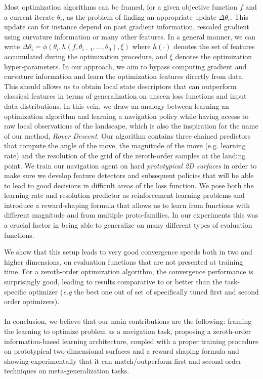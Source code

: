 	{
		Most optimization algorithms can be framed, for a given objective function $f$ and a current iterate $\theta_i$, as the problem of finding an appropriate update $\Delta \theta_i$. This update can for instance depend on past gradient information, rescaled gradient using curvature information or many other features. In a general manner, we can write $\Delta \theta_i = \phi( \theta_i, h(f,\theta_{i-1},\hdots,\theta_0),\xi)$ where $h(\cdot)$ denotes the set of features accumulated during the optimization procedure, and $\xi$ denotes the optimization hyper-parameters. 
		In our approach, we aim to bypass computing gradient and curvature information and learn the optimization features directly from data. This should allows us to obtain local state descriptors that can outperform classical features in terms of generalization on unseen loss functions and input data distributions. In this vein, we draw an analogy between learning an optimization algorithm and learning a navigation policy while having access to raw local observations of the landscape, which is also the inspiration for the name of our method, \emph{Rover Descent}. 
	Our algorithm contains three chained predictors that compute the angle of the move, the magnitude of the move (e.g. learning rate) and the resolution of the grid of the zeroth-order samples at the landing point. We train our navigation agent on hard \emph{prototypical 2D surfaces} in order to make sure we develop feature detectors and subsequent policies that will be able to lead to good decisions in difficult areas of the loss function. We pose both the learning rate and resolution predictor as reinforcement learning problems and introduce a reward-shaping formula that allows us to learn from functions with different magnitude and from multiple proto-families. In our experiments this was a crucial factor in being able to generalize on many different types of evaluation functions.
   	
	We show that this setup leads to very good convergence speeds both in two and higher dimensions, on evaluation functions that are not presented at training time. For a zeroth-order optimization algorithm, the convergence performance is surprisingly good, leading to results comparative to or better than the task-specific optimizer (\emph{e.g} the best one out of set of specifically tuned first and second order optimizers).
	
	 \paragraph{} In conclusion, we believe that our main contributions are the following: framing the learning to optimize problem as a navigation task,  proposing a zeroth-order information-based learning architecture, coupled with a proper training procedure on prototypical two-dimensional surfaces and a reward shaping formula and showing experimentally that it can match/outperform first and second order techniques on meta-generalization tasks.
	
}
